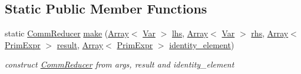 \subsection*{Static Public Member Functions}
\begin{DoxyCompactItemize}
\item 
static \hyperlink{classtvm_1_1tir_1_1CommReducer}{Comm\+Reducer} \hyperlink{classtvm_1_1tir_1_1CommReducerNode_a69338f35b7dcba5fa20d0595edd8e7b2}{make} (\hyperlink{classtvm_1_1Array}{Array}$<$ \hyperlink{classtvm_1_1tir_1_1Var}{Var} $>$ \hyperlink{classtvm_1_1tir_1_1CommReducerNode_a3fc76ed5cf3a73c803ce1c74dedf7429}{lhs}, \hyperlink{classtvm_1_1Array}{Array}$<$ \hyperlink{classtvm_1_1tir_1_1Var}{Var} $>$ \hyperlink{classtvm_1_1tir_1_1CommReducerNode_a2902b0d55dd823febc6941fae9f32337}{rhs}, \hyperlink{classtvm_1_1Array}{Array}$<$ \hyperlink{classtvm_1_1PrimExpr}{Prim\+Expr} $>$ \hyperlink{classtvm_1_1tir_1_1CommReducerNode_a7030917568a088215da423fc56882814}{result}, \hyperlink{classtvm_1_1Array}{Array}$<$ \hyperlink{classtvm_1_1PrimExpr}{Prim\+Expr} $>$ \hyperlink{classtvm_1_1tir_1_1CommReducerNode_ad8cbb3f8e12db0a2a814c1cbde2e8b9c}{identity\+\_\+element})
\begin{DoxyCompactList}\small\item\em construct \hyperlink{classtvm_1_1tir_1_1CommReducer}{Comm\+Reducer} from args, result and identity\+\_\+element \end{DoxyCompactList}\end{DoxyCompactItemize}
